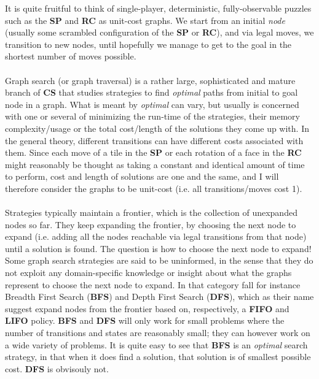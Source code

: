 It is quite fruitful to think of single-player, deterministic, fully-observable puzzles such as the \textbf{SP} and \textbf{RC} as unit-cost graphs. We start from an initial \textit{node} (usually some scrambled configuration of the \textbf{SP} or \textbf{RC}), and via legal moves, we transition to new nodes, until hopefully we manage to get to the goal in the shortest number of moves possible. 
\\
\\
Graph search (or graph traversal) is a rather large, sophisticated and mature branch of \textbf{CS} that studies strategies to find \textit{optimal} paths from initial to goal node in a graph. What is meant by \textit{optimal} can vary, but usually is concerned with one or several of minimizing the run-time of the strategies, their memory complexity/usage or the total cost/length of the solutions they come up with. In the general theory, different transitions can have different costs associated with them. Since each move of a tile in the \textbf{SP} or each rotation of a face in the \textbf{RC} might reasonably be thought as taking a constant and identical amount of time to perform, cost and length of solutions are one and the same, and I will therefore consider the graphs to be unit-cost (i.e. all transitions/moves cost 1).
\\
\\
Strategies typically maintain a frontier, which is the collection of unexpanded nodes so far. They keep expanding the frontier, by choosing the next node to expand (i.e. adding all the nodes reachable via legal transitions from that node) until a solution is found. The question is how to choose the next node to expand! Some graph search strategies are said to be uninformed, in the sense that they do not exploit any domain-specific knowledge or insight about what the graphs represent to choose the next node to expand. In that category fall for instance Breadth First Search (\textbf{BFS}) and Depth First Search (\textbf{DFS}), which as their name suggest expand nodes from the frontier based on, respectively, a \textbf{FIFO} and \textbf{LIFO} policy. \textbf{BFS} and \textbf{DFS} will only work for small problems where the number of transitions and states are reasonably small; they can however work on a wide variety of problems. It is quite easy to see that \textbf{BFS} is an \textit{optimal} search strategy, in that when it does find a solution, that solution is of smallest possible cost. \textbf{DFS} is obvisouly not.
\\
\\
